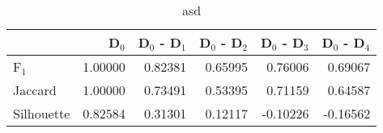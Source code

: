 \begin{table}
\centering
\caption{asd}
\label{asd}
\begin{tabular}{lrrrrr}
\toprule
{} &   D$_0$ &  D$_0$ - D$_1$ &  D$_0$ - D$_2$ &  D$_0$ - D$_3$ &  D$_0$ - D$_4$ \\
\midrule
F$_1$      & 1.00000 &        0.82381 &        0.65995 &        0.76006 &        0.69067 \\
Jaccard    & 1.00000 &        0.73491 &        0.53395 &        0.71159 &        0.64587 \\
Silhouette & 0.82584 &        0.31301 &        0.12117 &       -0.10226 &       -0.16562 \\
\bottomrule
\end{tabular}
\end{table}
